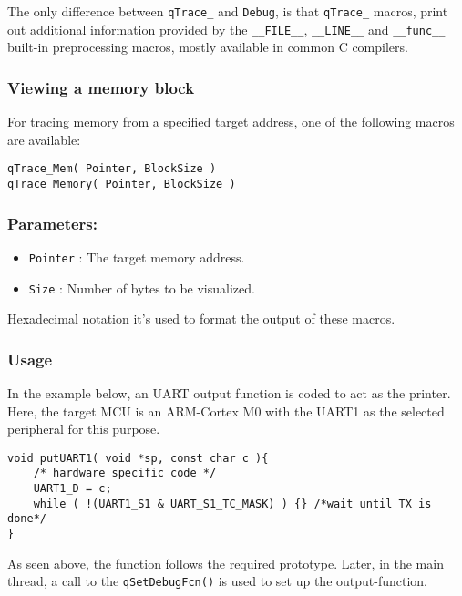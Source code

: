The only difference between \lstinline{qTrace_} and  \lstinline{Debug}, is that \lstinline{qTrace_} macros, print out additional information provided by the \lstinline{__FILE__}, \lstinline{__LINE__} and \lstinline{__func__} built-in preprocessing macros, mostly available in common C compilers. 

\subsubsection{Viewing a memory block}
For tracing memory from a specified target address, one of the following macros are available:  

\begin{lstlisting}[style=CStyle]
qTrace_Mem( Pointer, BlockSize )
qTrace_Memory( Pointer, BlockSize )
\end{lstlisting}

\subsubsection*{Parameters:}
\begin{itemize}
    \item \lstinline{Pointer} : The target memory address.
    \item \lstinline{Size} : Number of bytes to be visualized.
\end{itemize}

Hexadecimal notation it's used to format the output of these macros.

\subsubsection{Usage}

In the example below, an UART output function is coded to act as the printer. Here, the target MCU is an ARM-Cortex M0 with the UART1 as the selected peripheral for this purpose.
\medskip

\begin{lstlisting}[style=CStyle]
void putUART1( void *sp, const char c ){
    /* hardware specific code */
    UART1_D = c;
    while ( !(UART1_S1 & UART_S1_TC_MASK) ) {} /*wait until TX is done*/ 
}
\end{lstlisting}  

As seen above, the function follows the required prototype. Later, in the main thread, a call to the \lstinline{qSetDebugFcn()} is used to set up the output-function.

